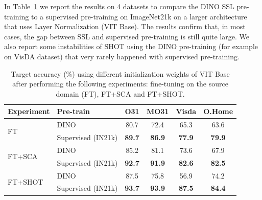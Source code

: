 \documentclass{article}
\begin{document}
In Table~\ref{tab:ssl2} we report the results on 4 datasets to compare the DINO SSL pre-training to a supervised pre-training on ImageNet21k on a larger architecture that uses Layer Normalization (VIT Base).
The results confirm that, in most cases, the gap between SSL and supervised pre-training is still quite large. We also report some instabilities of SHOT using the DINO pre-training (for example on VisDA dataset) that very rarely happened with supervised pre-training. 


\begin{table}[h!]
\begin{center}
\caption{Target accuracy (\%) using different initialization weights of VIT Base after performing the following experiments: fine-tuning on the source domain (FT), FT+SCA and FT+SHOT.}
\vspace{0.5cm}
\label{tab:ssl2}

\begin{footnotesize}
\begin{tabular}{llcccc}
\toprule
\textbf{Experiment} & \textbf{Pre-train} & \textbf{O31} & \textbf{MO31} &  \textbf{Visda} &  \textbf{O.Home} \\
\midrule
\multirow{2}{*}{FT} & DINO     &  80.7 &   72.4 &        65.3 &       63.6 \\
                    & Supervised (IN21k)  &  \textbf{89.7} &   \textbf{86.9} &        \textbf{77.9} &       \textbf{79.9} \\
\midrule
\multirow{2}{*}{FT+SCA}    & DINO     &  85.2 &   81.1 &        73.6 &       67.9 \\
                           & Supervised (IN21k) &  \textbf{92.7} &   \textbf{91.9} &        \textbf{82.6} &       \textbf{82.5} \\
\midrule
\multirow{2}{*}{FT+SHOT}   & DINO    &  87.5 &   75.8 &     56.9 &       74.2 \\
                           & Supervised (IN21k)  &  \textbf{93.7} &   \textbf{93.9} &        \textbf{87.5} &       \textbf{84.4} \\
                           
\bottomrule
\end{tabular}
\end{footnotesize}
    
        \end{center}
\end{table}
\end{document}

